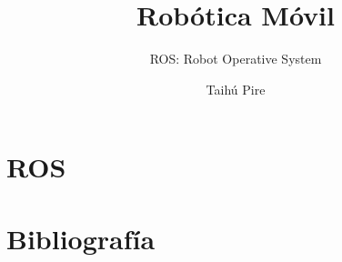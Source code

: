 \documentclass[aspectratio=169,compress]{beamer}
\subtitle{ROS: Robot Operative System}
\title{Robótica Móvil}
\author{Taihú Pire}
\institute{}
\date{}
\begin{document}
\frame{\titlepage}

\section{ROS}


\section{Bibliografía}

\end{document}
